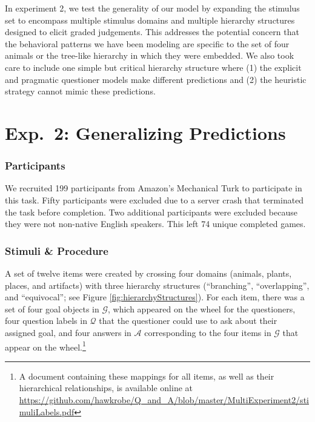 \documentclass[12pt, floatsintext, jou]{apa6}
\begin{document}
In experiment 2, we test the generality of our model by expanding the stimulus set to encompass multiple stimulus domains and multiple hierarchy structures designed to elicit graded judgements. This addresses the potential concern that the behavioral patterns we have been modeling are specific to the set of four animals or the tree-like hierarchy in which they were embedded. We also took care to include one simple but critical hierarchy structure where (1) the explicit and pragmatic questioner models make different predictions and (2) the heuristic strategy cannot mimic these predictions. 

\section{Exp.~2: Generalizing Predictions}

\subsubsection{Participants} We recruited 199 participants
from Amazon's Mechanical Turk to participate in this task. Fifty participants were excluded due to a server crash that terminated the task before completion. Two additional participants were excluded because they were not non-native English speakers. This left 74 unique completed games.


\subsubsection{Stimuli \& Procedure} A set of twelve items were created by crossing four domains (animals, plants, places, and artifacts) with three hierarchy structures (``branching'', ``overlapping'', and ``equivocal''; see Figure \ref{fig:hierarchyStructures}). For each item, there was a set of four goal objects in $\mathcal{G}$, which appeared on the wheel for the questioners, four question labels in $\mathcal{Q}$ that the questioner could use to ask about their assigned goal, and four answers in $\mathcal{A}$ corresponding to the four items in $\mathcal{G}$ that appear on the wheel.\footnote{A document containing these mappings for all items, as well as their hierarchical relationships, is available online at \url{https://github.com/hawkrobe/Q\_and\_A/blob/master/MultiExperiment2/stimuliLabels.pdf}} 
\end{document}
